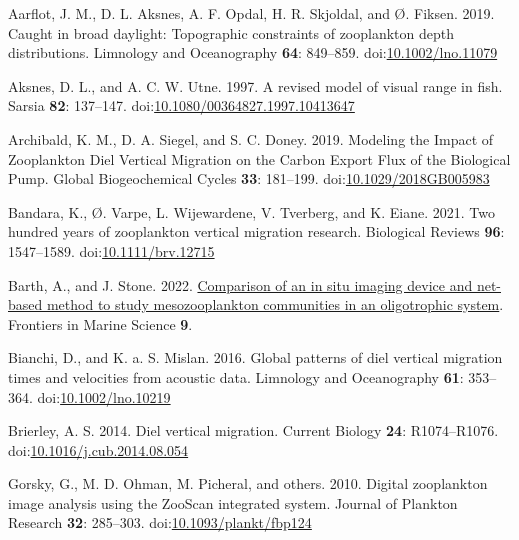 \documentclass[
  letterpaper,
  DIV=11,
  numbers=noendperiod]{scrartcl}
\newlength{\cslhangindent}
\newlength{\cslentryspacingunit} %
\newenvironment{CSLReferences}[2] %
 {%
  \setlength{\parindent}{0pt}
  \ifodd #1
  \let\oldpar\par
  \def\par{\hangindent=\cslhangindent\oldpar}
  \fi
  \setlength{\parskip}{#2\cslentryspacingunit}
 }%
 {}
\begin{document}
\hypertarget{refs}{}
\begin{CSLReferences}{1}{0}
\leavevmode{}%
Aarflot, J. M., D. L. Aksnes, A. F. Opdal, H. R. Skjoldal, and Ø.
Fiksen. 2019. Caught in broad daylight: Topographic constraints of
zooplankton depth distributions. Limnology and Oceanography \textbf{64}:
849--859.
doi:\href{https://doi.org/10.1002/lno.11079}{10.1002/lno.11079}

\leavevmode{}%
Aksnes, D. L., and A. C. W. Utne. 1997. A revised model of visual range
in fish. Sarsia \textbf{82}: 137--147.
doi:\href{https://doi.org/10.1080/00364827.1997.10413647}{10.1080/00364827.1997.10413647}

\leavevmode{}%
Archibald, K. M., D. A. Siegel, and S. C. Doney. 2019. Modeling the
Impact of Zooplankton Diel Vertical Migration on the Carbon Export Flux
of the Biological Pump. Global Biogeochemical Cycles \textbf{33}:
181--199.
doi:\href{https://doi.org/10.1029/2018GB005983}{10.1029/2018GB005983}

\leavevmode{}%
Bandara, K., Ø. Varpe, L. Wijewardene, V. Tverberg, and K. Eiane. 2021.
Two hundred years of zooplankton vertical migration research. Biological
Reviews \textbf{96}: 1547--1589.
doi:\href{https://doi.org/10.1111/brv.12715}{10.1111/brv.12715}

\leavevmode{}%
Barth, A., and J. Stone. 2022.
\href{https://www.frontiersin.org/articles/10.3389/fmars.2022.898057}{Comparison
of an in situ imaging device and net-based method to study
mesozooplankton communities in an oligotrophic system}. Frontiers in
Marine Science \textbf{9}.

\leavevmode{}%
Bianchi, D., and K. a. S. Mislan. 2016. Global patterns of diel vertical
migration times and velocities from acoustic data. Limnology and
Oceanography \textbf{61}: 353--364.
doi:\href{https://doi.org/10.1002/lno.10219}{10.1002/lno.10219}

\leavevmode{}%
Brierley, A. S. 2014. Diel vertical migration. Current Biology
\textbf{24}: R1074--R1076.
doi:\href{https://doi.org/10.1016/j.cub.2014.08.054}{10.1016/j.cub.2014.08.054}

\leavevmode{}%
Gorsky, G., M. D. Ohman, M. Picheral, and others. 2010. Digital
zooplankton image analysis using the ZooScan integrated system. Journal
of Plankton Research \textbf{32}: 285--303.
doi:\href{https://doi.org/10.1093/plankt/fbp124}{10.1093/plankt/fbp124}


\end{CSLReferences}
\end{document}
